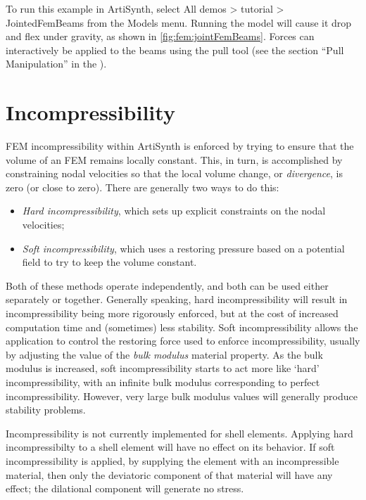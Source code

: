 To run this example in ArtiSynth, select {\sf All demos > tutorial >
JointedFemBeams} from the {\sf Models} menu. Running the model will
cause it drop and flex under gravity, as shown in 
\ref{fig:fem:jointFemBeams}. Forces can interactively
be applied to the beams using
the pull tool
(see the section ``Pull Manipulation'' in the
).

\section{Incompressibility}

FEM incompressibility within ArtiSynth is enforced by trying to ensure
that the volume of an FEM remains locally constant. This, in turn, is
accomplished by constraining nodal velocities so that the local volume change,
or \emph{divergence}, is zero (or close to zero). There are generally two
ways to do this:

\begin{itemize}
\item {\it Hard incompressibility}, which sets up explicit constraints on the
nodal velocities;
\item {\it Soft incompressibility}, which uses a restoring pressure based on a
potential field to try to keep the volume constant.
\end{itemize}

Both of these methods operate independently, and both can be used
either separately or together. Generally speaking, hard incompressibility
will result in incompressibility being more rigorously enforced, but
at the cost of increased computation time and (sometimes) less
stability. Soft incompressibility allows the application to control
the restoring force used to enforce incompressibility, usually by
adjusting the value of the \emph{bulk modulus} material property.  As
the bulk modulus is increased, soft incompressibility starts to act
more like `hard' incompressibility, with an infinite bulk modulus
corresponding to perfect incompressibility. However, very large bulk
modulus values will generally produce stability problems.

\begin{sideblock}
Incompressibility is not currently implemented for shell
elements. Applying hard incompressibilty to a shell element will have
no effect on its behavior. If soft incompressibility is applied,
by supplying the  element with an incompressible material, then only
the deviatoric component of that material will have any effect; the
dilational component will generate no stress.
\end{sideblock}


